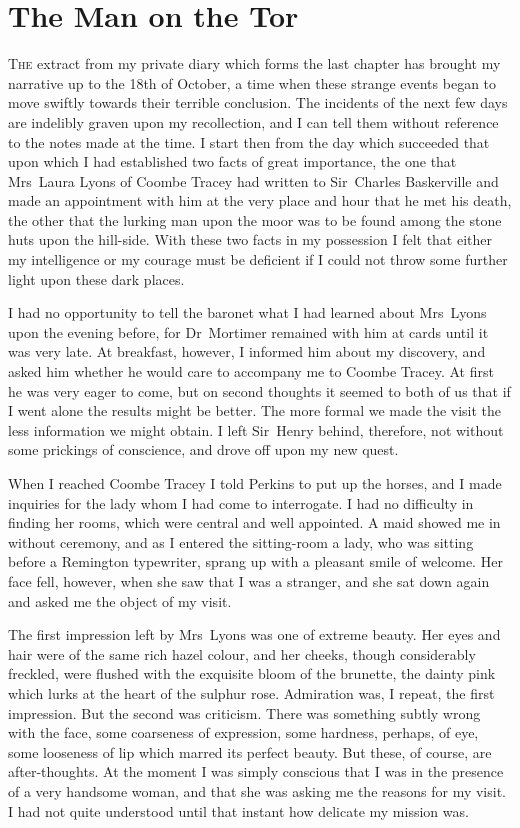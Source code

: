 \chapter{The Man on the Tor}
\lettrine{T}{he} extract from my private diary which forms the last chap\-ter has brought my narrative up to the 18th of October, a time when these strange events began to move swiftly towards their terrible conclusion. The incidents of the next few days are indelibly graven upon my recollection, and I can tell them without reference to the notes made at the time. I start then from the day which succeeded that upon which I had established two facts of great importance, the one that Mrs~Laura Lyons of Coombe Tracey had written to Sir~Charles Baskerville and made an appointment with him at the very place and hour that he met his death, the other that the lurking man upon the moor was to be found among the stone huts upon the hill-side. With these two facts in my possession I felt that either my intelligence or my courage must be deficient if I could not throw some further light upon these dark places.

I had no opportunity to tell the baronet what I had learned about Mrs~Lyons upon the evening before, for Dr~Mortimer remained with him at cards until it was very late. At breakfast, however, I informed him about my discovery, and asked him whether he would care to accompany me to Coombe Tracey. At first he was very eager to come, but on second thoughts it seemed to both of us that if I went alone the results might be better. The more formal we made the visit the less information we might obtain. I left Sir~Henry behind, therefore, not without some prickings of conscience, and drove off upon my new quest.

When I reached Coombe Tracey I told Perkins to put up the horses, and I made inquiries for the lady whom I had come to interrogate. I had no difficulty in finding her rooms, which were central and well appointed. A maid showed me in without ceremony, and as I entered the sitting-room a lady, who was sitting before a Remington typewriter, sprang up with a pleasant smile of welcome. Her face fell, however, when she saw that I was a stranger, and she sat down again and asked me the object of my visit.

The first impression left by Mrs~Lyons was one of extreme beau\-ty. Her eyes and hair were of the same rich hazel colour, and her cheeks, though considerably freckled, were flushed with the exquisite bloom of the brunette, the dainty pink which lurks at the heart of the sulphur rose. Admiration was, I repeat, the first impression. But the second was criticism. There was something subtly wrong with the face, some coarseness of expression, some hardness, perhaps, of eye, some looseness of lip which marred its perfect beauty. But these, of course, are after-thoughts. At the moment I was simply conscious that I was in the presence of a very handsome woman, and that she was asking me the reasons for my visit. I had not quite understood until that instant how delicate my mission was.

